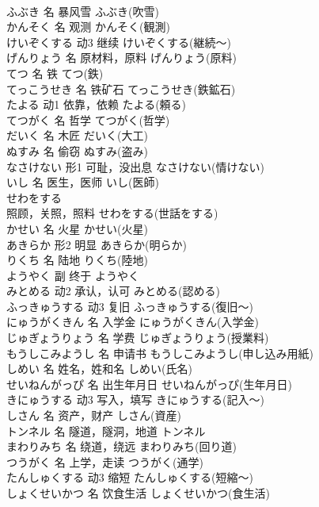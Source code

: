 \documentclass[8pt]{extreport}
\begin{document}
\begin{CJK}{UTF8}{min}
\\	ふぶき	名	暴风雪	ふぶき(吹雪)	
\\	かんそく	名	观测	かんそく(観測)	
\\	けいぞくする	动3	继续	けいぞくする(継続～)	
\\	げんりょう	名	原材料，原料	げんりょう(原料)	
\\	てつ	名	铁	てつ(鉄)	
\\	てっこうせき	名	铁矿石	てっこうせき(鉄鉱石)	
\\	たよる	动1	依靠，依赖	たよる(頼る)	
\\	てつがく	名	哲学	てつがく(哲学)	
\\	だいく	名	木匠	だいく(大工)	
\\	ぬすみ	名	偷窃	ぬすみ(盗み)	
\\	なさけない	形1	可耻，没出息	なさけない(情けない)	
\\	いし	名	医生，医师	いし(医師)	
\\	せわをする	
\\	照顾，关照，照料	せわをする(世話をする)	
\\	かせい	名	火星	かせい(火星)	
\\	あきらか	形2	明显	あきらか(明らか)	
\\	りくち	名	陆地	りくち(陸地)	
\\	ようやく	副	终于	ようやく	
\\	みとめる	动2	承认，认可	みとめる(認める)	
\\	ふっきゅうする	动3	复旧	ふっきゅうする(復旧～)	
\\	にゅうがくきん	名	入学金	にゅうがくきん(入学金)	
\\	じゅぎょうりょう	名	学费	じゅぎょうりょう(授業料)	
\\	もうしこみようし	名	申请书	もうしこみようし(申し込み用紙)	
\\	しめい	名	姓名，姓和名	しめい(氏名)	
\\	せいねんがっぴ	名	出生年月日	せいねんがっぴ(生年月日)	
\\	きにゅうする	动3	写入，填写	きにゅうする(記入～)	
\\	しさん	名	资产，财产	しさん(資産)	
\\	トンネル	名	隧道，隧洞，地道	トンネル	
\\	まわりみち	名	绕道，绕远	まわりみち(回り道)	
\\	つうがく	名	上学，走读	つうがく(通学)	
\\	たんしゅくする	动3	缩短	たんしゅくする(短縮～)	
\\	しょくせいかつ	名	饮食生活	しょくせいかつ(食生活)	

\end{CJK}
\end{document}
